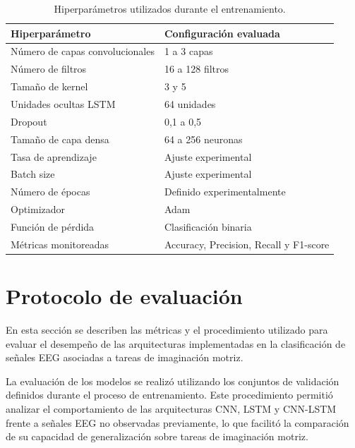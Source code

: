 \begin{table}[htbp]
\centering
\caption{Hiperparámetros utilizados durante el entrenamiento.}
\label{tab:hiperparametros}

\begin{tabular}{L{6cm}L{6cm}}
\toprule
\textbf{Hiperparámetro} & \textbf{Configuración evaluada} \\ 
\midrule

Número de capas convolucionales &
1 a 3 capas \\ 

Número de filtros &
16 a 128 filtros \\ 

Tamaño de kernel &
3 y 5 \\ 

Unidades ocultas LSTM &
64 unidades \\ 

Dropout &
0,1 a 0,5 \\ 

Tamaño de capa densa &
64 a 256 neuronas \\ 

Tasa de aprendizaje &
Ajuste experimental \\ 

Batch size &
Ajuste experimental \\ 

Número de épocas &
Definido experimentalmente \\ 

Optimizador &
Adam \\ 

Función de pérdida &
Clasificación binaria \\ 

Métricas monitoreadas &
Accuracy, Precision, Recall y F1-score \\ 

\end{tabular}
\end{table}

\FloatBarrier

\section{Protocolo de evaluación}

En esta sección se describen las métricas y el procedimiento utilizado para evaluar el desempeño de las arquitecturas implementadas en la clasificación de señales EEG asociadas a tareas de imaginación motriz.

La evaluación de los modelos se realizó utilizando los conjuntos de validación definidos durante el proceso de entrenamiento. Este procedimiento permitió analizar el comportamiento de las arquitecturas CNN, LSTM y CNN-LSTM frente a señales EEG no observadas previamente, lo que facilitó la comparación de su capacidad de generalización sobre tareas de imaginación motriz.

